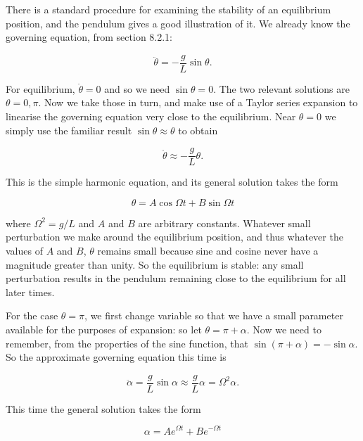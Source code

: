   There is a standard procedure for examining the stability of an equilibrium 
  position, and the pendulum gives a good illustration of it. We already know 
  the governing equation, from section 8.2.1: 

  \begin{equation*}\ddot{\theta} = -\dfrac{g}{L} \sin \theta . 
  \tag{1}\end{equation*} 

  For equilibrium, $\ddot{\theta}=0$ and so we need $\sin \theta =0$. The two 
  relevant solutions are $\theta=0,\pi$. Now we take those in turn, and make 
  use of a Taylor series expansion to linearise the governing equation very 
  close to the equilibrium. Near $\theta =0$ we simply use the familiar result 
  $\sin \theta \approx \theta$ to obtain 

  \begin{equation*}\ddot{\theta} \approx -\dfrac{g}{L} \theta . 
  \tag{2}\end{equation*} 

  This is the simple harmonic equation, and its general solution takes the form 

  \begin{equation*}\theta = A \cos \Omega t + B \sin \Omega t 
  \tag{3}\end{equation*} 

  \noindent{}where $\Omega^2=g/L$ and $A$ and $B$ are arbitrary constants. 
  Whatever small perturbation we make around the equilibrium position, and thus 
  whatever the values of $A$ and $B$, $\theta$ remains small because sine and 
  cosine never have a magnitude greater than unity. So the equilibrium is 
  stable: any small perturbation results in the pendulum remaining close to the 
  equilibrium for all later times. 

  For the case $\theta = \pi$, we first change variable so that we have a small 
  parameter available for the purposes of expansion: so let $\theta = \pi + 
  \alpha$. Now we need to remember, from the properties of the sine function, 
  that $\sin (\pi + \alpha) = -\sin \alpha$. So the approximate governing 
  equation this time is 

  \begin{equation*}\ddot{\alpha} = \dfrac{g}{L} \sin \alpha \approx 
  \dfrac{g}{L} \alpha = \Omega^2 \alpha. \tag{4}\end{equation*} 

  This time the general solution takes the form 

  \begin{equation*}\alpha = A e^{\Omega t} + B e^{-\Omega t} 
  \tag{5}\end{equation*} 

